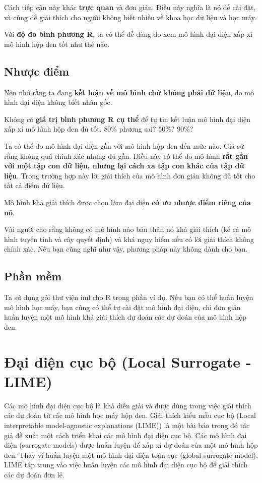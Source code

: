Cách tiếp cận này khác \textbf{trực quan} và đơn giản. Điều này nghĩa là nó dễ cài đặt, và cũng dễ giải thích cho người không biết nhiều về khoa học dữ liệu và học máy.

Với \textbf{độ đo bình phương R}, ta có thể dễ dàng đo xem mô hình đại diện xấp xỉ mô hình hộp đen tốt như thế nào.
\subsection{Nhược điểm}
Nên nhớ rằng ta đang \textbf{kết luận về mô hình chứ không phải dữ liệu}, do mô hình đại diện không biết nhãn gốc.

Không có \textbf{giá trị bình phương R cụ thể} để tự tin kết luận mô hình đại diện xấp xỉ mô hình hộp đen đủ tốt. $80\%$ phương sai? $50\%$? $90\%$?

Ta có thể đo mô hình đại diện gần với mô hình hộp đen đến mức nào. Giả sử rằng không quá chính xác nhưng đủ gần. Điều này có thể do mô hình \textbf{rất gần với một tập con dữ liệu, nhưng lại cách xa tập con khác của tập dữ liệu}. Trong trường hợp này lời giải thích của mô hình đơn giản không đủ tốt cho tất cả điểm dữ liệu.

Mô hình khả giải thích được chọn làm đại diện \textbf{có ưu nhược điểm riêng của nó}.

Vài người cho rằng không có mô hình nào bản thân nó khả giải thích (kể cả mô hình tuyến tính và cây quyết định) và khá nguy hiểm nếu có lời giải thích không chính xác. Nếu bạn cũng nghĩ như vậy, phương pháp này không dành cho bạn.
\subsection{Phần mềm}
Ta sử dụng gói thư viện iml cho R trong phần ví dụ. Nếu bạn có thể huấn luyện mô hình học máy, bạn cũng có thể tự cài đặt mô hình đại diện, chỉ đơn giản huấn luyện một mô hình khả giải thích dự đoán các dự đoán của mô hình hộp đen.

\clearpage
\section{Đại diện cục bộ (Local Surrogate - LIME)}
Các mô hình đại diện cục bộ là khả diễn giải và được dùng trong việc giải thích các dự đoán từ các mô hình học máy hộp đen. Giải thích kiểu mẫu cục bộ (Local interpretable model-agnostic explanations (LIME)) là một bài báo trong đó tác giả đề xuất một cách triển khai các mô hình đại diện cục bộ. Các mô hình đại diện (surrogate models) được huấn luyện để xấp xỉ dự đoán của một mô hình hộp đen. Thay vì huấn luyện một mô hình đại diện toàn cục (global surrogate model), LIME tập trung vào việc huấn luyện các mô hình đại diện cục bộ để giải thích các dự đoán đơn lẻ.

